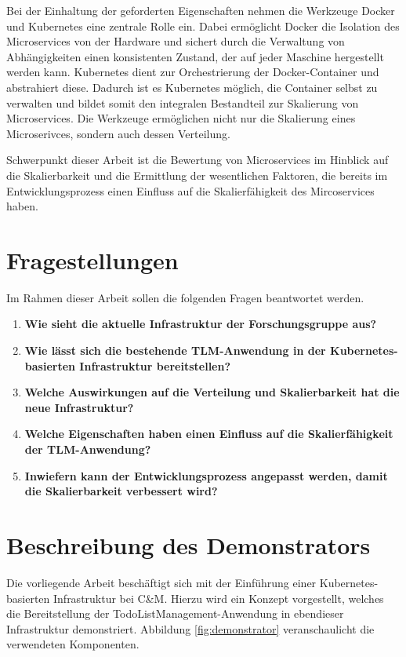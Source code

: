 Bei der Einhaltung der geforderten Eigenschaften nehmen die Werkzeuge Docker und Kubernetes eine zentrale Rolle ein.
Dabei ermöglicht Docker die Isolation des Microservices von der Hardware und sichert durch die Verwaltung von Abhängigkeiten einen konsistenten Zustand, der auf jeder Maschine hergestellt werden kann. 
Kubernetes dient zur Orchestrierung der Docker-Container und abstrahiert diese.
Dadurch ist es Kubernetes möglich, die Container selbst zu verwalten und bildet somit den integralen Bestandteil zur Skalierung von Microservices.
Die Werkzeuge ermöglichen nicht nur die Skalierung eines Microserivces, sondern auch dessen Verteilung.

Schwerpunkt dieser Arbeit ist die Bewertung von Microservices im Hinblick auf die Skalierbarkeit und die Ermittlung der wesentlichen Faktoren, die bereits im Entwicklungsprozess einen Einfluss auf die Skalierfähigkeit des Mircoservices haben.

\section{Fragestellungen}

Im Rahmen dieser Arbeit sollen die folgenden Fragen beantwortet werden.

\begin{enumerate}
	\item \textbf{Wie sieht die aktuelle Infrastruktur der Forschungsgruppe aus?}
    \item \textbf{Wie lässt sich die bestehende TLM-Anwendung in der Kubernetes-basierten Infrastruktur bereitstellen?}
	\item \textbf{Welche Auswirkungen auf die Verteilung und Skalierbarkeit hat die neue Infrastruktur?}
	\item \textbf{Welche Eigenschaften haben einen Einfluss auf die Skalierfähigkeit der TLM-Anwendung?}
	\item \textbf{Inwiefern kann der Entwicklungsprozess angepasst werden, damit die Skalierbarkeit verbessert wird?}
\end{enumerate}

\section{Beschreibung des Demonstrators}

Die vorliegende Arbeit beschäftigt sich mit der Einführung einer Kubernetes-basierten Infrastruktur bei C\&M.
Hierzu wird ein Konzept vorgestellt, welches die Bereitstellung der TodoListManagement-Anwendung in ebendieser Infrastruktur demonstriert.
Abbildung \ref{fig:demonstrator} veranschaulicht die verwendeten Komponenten.

